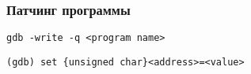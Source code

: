 \begin{frame}[fragile]
  \frametitle{Патчинг программы}
  \begin{verbatim}
gdb -write -q <program name>
  \end{verbatim}
\pause
\vspace{2ex}
  \begin{verbatim}
(gdb) set {unsigned char}<address>=<value>
  \end{verbatim}
\end{frame}





